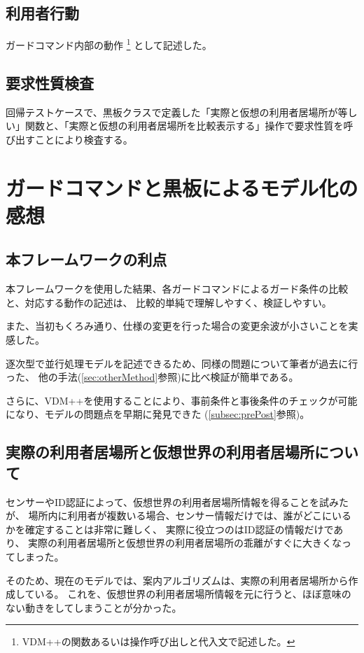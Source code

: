 \documentclass[a4paper,8pt]{jsarticle}
\begin{document}
\subsection{利用者行動}
ガードコマンド内部の動作
\footnote{VDM++\cite{CSK2007PP}の関数あるいは操作呼び出しと代入文で記述した。}
として記述した。

\subsection{要求性質検査}
回帰テストケースで、黒板クラスで定義した「実際と仮想の利用者居場所が等しい」関数と、「実際と仮想の利用者居場所を比較表示する」操作で要求性質を呼び出すことにより検査する。

\newpage

\section{ガードコマンドと黒板によるモデル化の感想}
\subsection {本フレームワークの利点}
本フレームワークを使用した結果、各ガードコマンドによるガード条件の比較と、対応する動作の記述は、
比較的単純で理解しやすく、検証しやすい。

また、当初もくろみ通り、仕様の変更を行った場合の変更余波が小さいことを実感した。

逐次型で並行処理モデルを記述できるため、同様の問題について筆者が過去に行った、
他の手法(\ref{sec:otherMethod}参照)に比べ検証が簡単である。

さらに、VDM++を使用することにより、事前条件と事後条件のチェックが可能になり、モデルの問題点を早期に発見できた
(\ref{subsec:prePost}参照)。

\subsection {実際の利用者居場所と仮想世界の利用者居場所について}
\label{sec:realVsVirtual}
センサーやID認証によって、仮想世界の利用者居場所情報を得ることを試みたが、
場所内に利用者が複数いる場合、センサー情報だけでは、誰がどこにいるかを確定することは非常に難しく、
実際に役立つのはID認証の情報だけであり、
実際の利用者居場所と仮想世界の利用者居場所の乖離がすぐに大きくなってしまった。

そのため、現在のモデルでは、案内アルゴリズムは、実際の利用者居場所から作成している。
これを、仮想世界の利用者居場所情報を元に行うと、ほぼ意味のない動きをしてしまうことが分かった。
\end{document}
